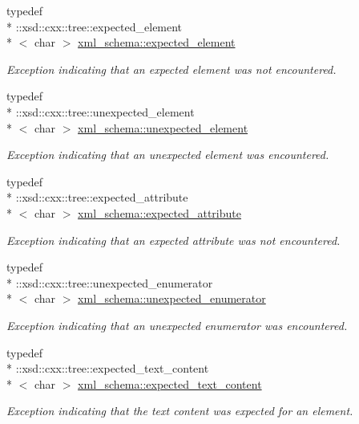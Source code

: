 \begin{DoxyCompactItemize}
typedef \\*
\-::xsd\-::cxx\-::tree\-::expected\-\_\-element\\*
$<$ char $>$ \hyperlink{namespacexml__schema_a4b608c951db27c574552da0bda062e1a}{xml\-\_\-schema\-::expected\-\_\-element}
\begin{DoxyCompactList}\small\item\em Exception indicating that an expected element was not encountered. \end{DoxyCompactList}\item 
typedef \\*
\-::xsd\-::cxx\-::tree\-::unexpected\-\_\-element\\*
$<$ char $>$ \hyperlink{namespacexml__schema_a55835ab195e4c70bc05de5bbac871110}{xml\-\_\-schema\-::unexpected\-\_\-element}
\begin{DoxyCompactList}\small\item\em Exception indicating that an unexpected element was encountered. \end{DoxyCompactList}\item 
typedef \\*
\-::xsd\-::cxx\-::tree\-::expected\-\_\-attribute\\*
$<$ char $>$ \hyperlink{namespacexml__schema_ad8a9d3a09372da61ab6ba78c4de87a26}{xml\-\_\-schema\-::expected\-\_\-attribute}
\begin{DoxyCompactList}\small\item\em Exception indicating that an expected attribute was not encountered. \end{DoxyCompactList}\item 
typedef \\*
\-::xsd\-::cxx\-::tree\-::unexpected\-\_\-enumerator\\*
$<$ char $>$ \hyperlink{namespacexml__schema_aa088274f605e06cd53d9062265b5229c}{xml\-\_\-schema\-::unexpected\-\_\-enumerator}
\begin{DoxyCompactList}\small\item\em Exception indicating that an unexpected enumerator was encountered. \end{DoxyCompactList}\item 
typedef \\*
\-::xsd\-::cxx\-::tree\-::expected\-\_\-text\-\_\-content\\*
$<$ char $>$ \hyperlink{namespacexml__schema_a1994323b3f5fee8db7891f02bb9144b9}{xml\-\_\-schema\-::expected\-\_\-text\-\_\-content}
\begin{DoxyCompactList}\small\item\em Exception indicating that the text content was expected for an element. \end{DoxyCompactList}\item 

\end{DoxyCompactItemize}
